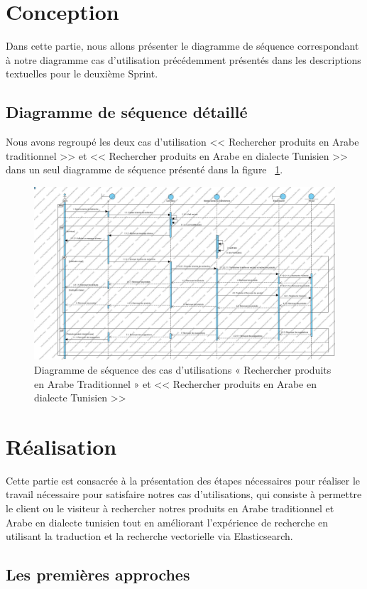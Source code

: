 \section{Conception}
\noindent
Dans cette partie, nous allons présenter le diagramme de séquence correspondant à notre diagramme cas d'utilisation précédemment présentés dans les descriptions textuelles pour le deuxième Sprint.

\subsection{Diagramme de séquence détaillé}
\noindent
Nous avons regroupé les deux cas d'utilisation << Rechercher produits en Arabe traditionnel >> et << Rechercher produits en Arabe en dialecte Tunisien >> dans un seul diagramme de séquence présenté dans la figure ~\ref{fig:diagseqsprint2}.

\begin{figure}[H]
	\centering
	\includegraphics[width=1\textwidth]{logos/seqsprint2.png}
	\caption{Diagramme de séquence des cas d’utilisations « Rechercher produits en Arabe Traditionnel » et << Rechercher produits en Arabe en dialecte Tunisien >>}
	\label{fig:diagseqsprint2}
\end{figure}

\section{Réalisation}
\noindent
Cette partie est consacrée à la présentation des étapes nécessaires pour réaliser le travail nécessaire pour satisfaire notres cas d'utilisations, qui consiste à permettre le client ou le visiteur à rechercher notres produits en Arabe traditionnel et Arabe en dialecte tunisien tout en améliorant l'expérience de recherche en utilisant la traduction et la recherche vectorielle via Elasticsearch.

\newpage
\subsection{Les premières approches}
\noindent